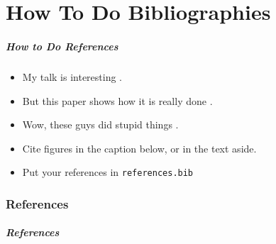 \part{How To Do Bibliographies}
\begin{frame}
    \frametitle{How to Do References}
    \begin{itemize}
      \item My talk is interesting \cite{ref1}.
      \item But this paper shows how it is really done \cite{ref2}.
      \item Wow, these guys did stupid things \cite{ref3}.
      \item Cite figures in the caption below, or in the text aside.
      \item Put your references in \texttt{references.bib}
    \end{itemize}
\end{frame}

\section{References}
\begin{frame}[allowframebreaks]
\frametitle{References}
    \tiny{}
    
\end{frame}
